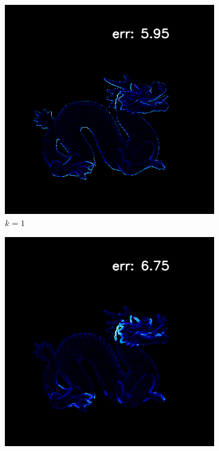 \begin{figure}[th]
	\centering
	\captionsetup{width=\linewidth}
	\begin{subfigure}[b]{0.24\linewidth}
		\includegraphics[width=\linewidth]{./Figures/svd-synthetic/k-compare/k1.png}
		\caption{$ k=1 $}
	\end{subfigure}
	\begin{subfigure}[b]{0.24\linewidth}
		\includegraphics[width=\linewidth]{./Figures/svd-synthetic/k-compare/k2.png}

\end{subfigure}
\end{figure}
